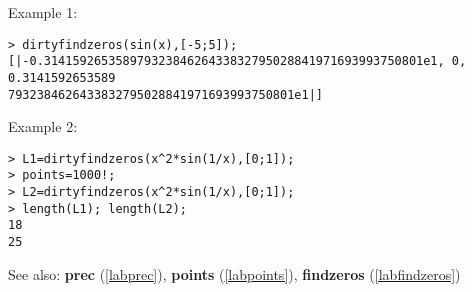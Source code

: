 \noindent Example 1: 
\begin{center}\begin{minipage}{15cm}\begin{Verbatim}[frame=single]
> dirtyfindzeros(sin(x),[-5;5]);
[|-0.31415926535897932384626433832795028841971693993750801e1, 0, 0.3141592653589
7932384626433832795028841971693993750801e1|]
\end{Verbatim}
\end{minipage}\end{center}
\noindent Example 2: 
\begin{center}\begin{minipage}{15cm}\begin{Verbatim}[frame=single]
> L1=dirtyfindzeros(x^2*sin(1/x),[0;1]);
> points=1000!;
> L2=dirtyfindzeros(x^2*sin(1/x),[0;1]);
> length(L1); length(L2);
18
25
\end{Verbatim}
\end{minipage}\end{center}
See also: \textbf{prec} (\ref{labprec}), \textbf{points} (\ref{labpoints}), \textbf{findzeros} (\ref{labfindzeros})
